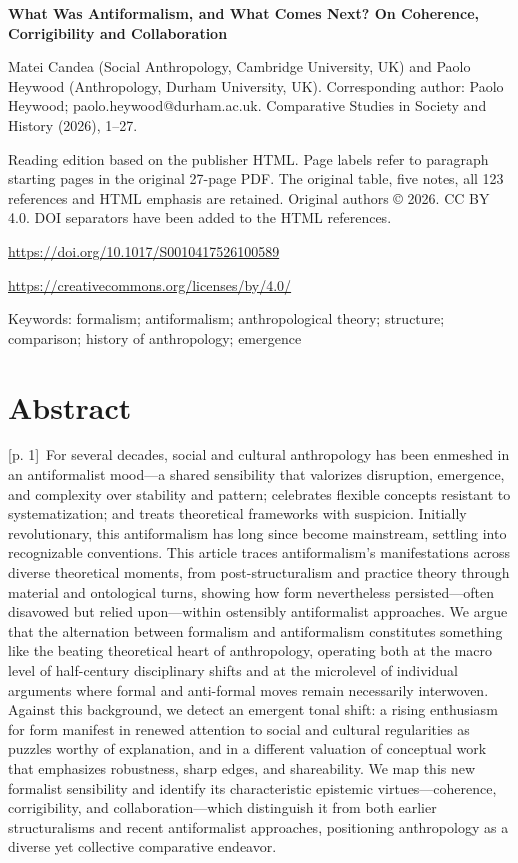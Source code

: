 \documentclass[10pt,a4paper]{article}
\begin{document}
{\Large\bfseries What Was Antiformalism, and What Comes Next? On Coherence, Corrigibility and Collaboration\par}\medskip

Matei Candea (Social Anthropology, Cambridge University, UK) and Paolo Heywood (Anthropology, Durham University, UK). Corresponding author: Paolo Heywood; paolo.heywood@durham.ac.uk. Comparative Studies in Society and History (2026), 1–27.\par
Reading edition based on the publisher HTML. Page labels refer to paragraph starting pages in the original 27-page PDF. The original table, five notes, all 123 references and HTML emphasis are retained. Original authors © 2026. CC BY 4.0. DOI separators have been added to the HTML references.\par
\url{https://doi.org/10.1017/S0010417526100589}\par
\url{https://creativecommons.org/licenses/by/4.0/}\par
Keywords: formalism; antiformalism; anthropological theory; structure; comparison; history of anthropology; emergence\par\bigskip
{}\section*{Abstract}
{\scriptsize\color{gray} [p. 1]}\ For several decades, social and cultural anthropology has been enmeshed in an antiformalist mood—a shared sensibility that valorizes disruption, emergence, and complexity over stability and pattern; celebrates flexible concepts resistant to systematization; and treats theoretical frameworks with suspicion. Initially revolutionary, this antiformalism has long since become mainstream, settling into recognizable conventions. This article traces antiformalism’s manifestations across diverse theoretical moments, from post-structuralism and practice theory through material and ontological turns, showing how form nevertheless persisted—often disavowed but relied upon—within ostensibly antiformalist approaches. We argue that the alternation between formalism and antiformalism constitutes something like the beating theoretical heart of anthropology, operating both at the macro level of half-century disciplinary shifts and at the microlevel of individual arguments where formal and anti-formal moves remain necessarily interwoven. Against this background, we detect an emergent tonal shift: a rising enthusiasm for form manifest in renewed attention to social and cultural regularities as puzzles worthy of explanation, and in a different valuation of conceptual work that emphasizes robustness, sharp edges, and shareability. We map this new formalist sensibility and identify its characteristic epistemic virtues—coherence, corrigibility, and collaboration—which distinguish it from both earlier structuralisms and recent antiformalist approaches, positioning anthropology as a diverse yet collective comparative endeavor.\par
\end{document}
